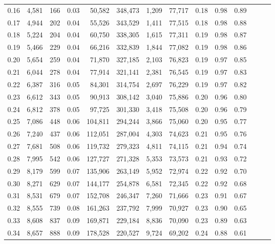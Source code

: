 \begin{tabular}{rrrrrrrrrrrrrr}
0.16 &  4,581 &    166 &  0.03 &   50,582 &  348,473 &   1,209 &  77,717 &  0.18 &  0.98 &      0.89 \\
0.17 &  4,944 &    202 &  0.04 &   55,526 &  343,529 &   1,411 &  77,515 &  0.18 &  0.98 &      0.88 \\
0.18 &  5,224 &    204 &  0.04 &   60,750 &  338,305 &   1,615 &  77,311 &  0.19 &  0.98 &      0.87 \\
0.19 &  5,466 &    229 &  0.04 &   66,216 &  332,839 &   1,844 &  77,082 &  0.19 &  0.98 &      0.86 \\
0.20 &  5,654 &    259 &  0.04 &   71,870 &  327,185 &   2,103 &  76,823 &  0.19 &  0.97 &      0.85 \\
0.21 &  6,044 &    278 &  0.04 &   77,914 &  321,141 &   2,381 &  76,545 &  0.19 &  0.97 &      0.83 \\
0.22 &  6,387 &    316 &  0.05 &   84,301 &  314,754 &   2,697 &  76,229 &  0.19 &  0.97 &      0.82 \\
0.23 &  6,612 &    343 &  0.05 &   90,913 &  308,142 &   3,040 &  75,886 &  0.20 &  0.96 &      0.80 \\
0.24 &  6,812 &    378 &  0.05 &   97,725 &  301,330 &   3,418 &  75,508 &  0.20 &  0.96 &      0.79 \\
0.25 &  7,086 &    448 &  0.06 &  104,811 &  294,244 &   3,866 &  75,060 &  0.20 &  0.95 &      0.77 \\
0.26 &  7,240 &    437 &  0.06 &  112,051 &  287,004 &   4,303 &  74,623 &  0.21 &  0.95 &      0.76 \\
0.27 &  7,681 &    508 &  0.06 &  119,732 &  279,323 &   4,811 &  74,115 &  0.21 &  0.94 &      0.74 \\
0.28 &  7,995 &    542 &  0.06 &  127,727 &  271,328 &   5,353 &  73,573 &  0.21 &  0.93 &      0.72 \\
0.29 &  8,179 &    599 &  0.07 &  135,906 &  263,149 &   5,952 &  72,974 &  0.22 &  0.92 &      0.70 \\
0.30 &  8,271 &    629 &  0.07 &  144,177 &  254,878 &   6,581 &  72,345 &  0.22 &  0.92 &      0.68 \\
0.31 &  8,531 &    679 &  0.07 &  152,708 &  246,347 &   7,260 &  71,666 &  0.23 &  0.91 &      0.67 \\
0.32 &  8,555 &    739 &  0.08 &  161,263 &  237,792 &   7,999 &  70,927 &  0.23 &  0.90 &      0.65 \\
0.33 &  8,608 &    837 &  0.09 &  169,871 &  229,184 &   8,836 &  70,090 &  0.23 &  0.89 &      0.63 \\
0.34 &  8,657 &    888 &  0.09 &  178,528 &  220,527 &   9,724 &  69,202 &  0.24 &  0.88 &      0.61 \\

\end{tabular}
